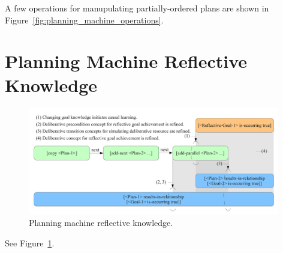 A few operations for manupulating partially-ordered plans are shown in
Figure~\ref{fig:planning_machine_operations}.


\section{Planning Machine Reflective Knowledge}

\begin{figure}[bth]
  \center
  \includegraphics[width=11cm]{gfx/planning_machine_reflective_knowledge}
  \caption[Planning machine reflective knowledge]{Planning machine reflective knowledge.}
  \label{fig:planning_machine_reflective_knowledge}
\end{figure}

See Figure~\ref{fig:planning_machine_reflective_knowledge}.

